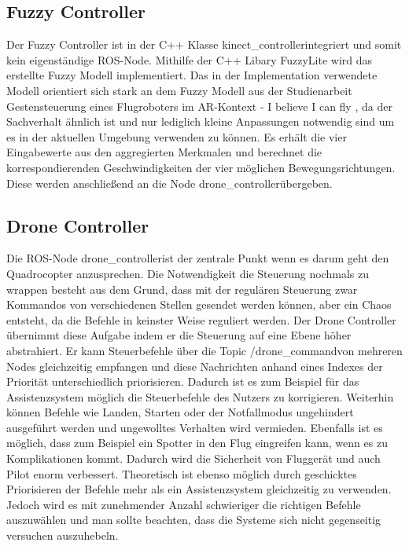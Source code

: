 \subsection{Fuzzy Controller}
Der Fuzzy Controller ist in der C++ Klasse \grqq kinect\_controller\grqq \space integriert und somit kein eigenständige ROS-Node. Mithilfe der C++ Libary FuzzyLite\cite{fuzzylite} wird das erstellte Fuzzy Modell implementiert. Das in der Implementation verwendete Modell orientiert sich stark an dem Fuzzy Modell aus der Studienarbeit \grqq Gestensteuerung eines Flugroboters im AR-Kontext - I believe I can fly \grqq\cite{studienarbeitfly}, da der Sachverhalt ähnlich ist und nur lediglich kleine Anpassungen notwendig sind um es in der aktuellen Umgebung verwenden zu können. Es erhält die vier Eingabewerte aus den aggregierten Merkmalen und berechnet die korrespondierenden Geschwindigkeiten der vier möglichen Bewegungsrichtungen. Diese werden anschließend an die Node \grqq drone\_controller\grqq \space übergeben.
\subsection{Drone Controller}
Die ROS-Node \grqq drone\_controller\grqq \space ist der zentrale Punkt wenn es darum geht den Quadrocopter anzusprechen. Die Notwendigkeit die Steuerung nochmals zu wrappen besteht aus dem Grund, dass mit der regulären Steuerung zwar Kommandos von verschiedenen Stellen gesendet werden können, aber ein Chaos entsteht, da die Befehle in keinster Weise reguliert werden. Der Drone Controller übernimmt diese Aufgabe indem er die Steuerung auf eine Ebene höher abstrahiert. Er kann Steuerbefehle über die Topic \grqq /drone\_command\grqq \space von mehreren Nodes gleichzeitig empfangen und diese Nachrichten anhand eines Indexes der Priorität unterschiedlich priorisieren. Dadurch ist es zum Beispiel für das Assistenzsystem möglich die Steuerbefehle des Nutzers zu korrigieren. Weiterhin können Befehle wie Landen, Starten oder der Notfallmodus ungehindert ausgeführt werden und ungewolltes Verhalten wird vermieden. Ebenfalls ist es möglich, dass zum Beispiel ein Spotter in den Flug eingreifen kann, wenn es zu Komplikationen kommt. Dadurch wird die Sicherheit von Fluggerät und auch Pilot enorm verbessert. Theoretisch ist ebenso möglich durch geschicktes Priorisieren der Befehle mehr als ein Assistenzsystem gleichzeitig zu verwenden. Jedoch wird es mit zunehmender Anzahl schwieriger die richtigen Befehle auszuwählen und man sollte beachten, dass die Systeme sich nicht gegenseitig versuchen auszuhebeln. 
